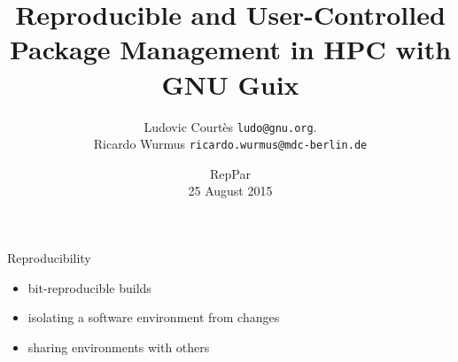 \documentclass{beamer}
\title{Reproducible and User-Controlled Package Management in HPC with GNU Guix}
\author{Ludovic Courtès \texttt{ludo@gnu.org}.\\Ricardo Wurmus \texttt{ricardo.wurmus@mdc-berlin.de}}
\date{\small{RepPar\\25 August 2015}}
\begin{document}
\maketitle





\begin{frame}{Reproducibility}

  \Large{
    \begin{itemize}
    \item bit-reproducible builds

    \item isolating a software environment from changes

    \item sharing environments with others
    \end{itemize}
  }
\end{frame}
\end{document}

